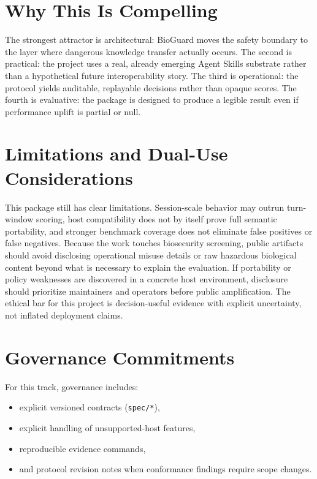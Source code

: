 \documentclass[10.5pt,a4paper]{article}
\begin{document}
\section*{Why This Is Compelling}

The strongest attractor is architectural: BioGuard moves the safety boundary to the layer where dangerous knowledge transfer actually occurs. The second is practical: the project uses a real, already emerging Agent Skills substrate rather than a hypothetical future interoperability story. The third is operational: the protocol yields auditable, replayable decisions rather than opaque scores. The fourth is evaluative: the package is designed to produce a legible result even if performance uplift is partial or null.

\section*{Limitations and Dual-Use Considerations}

This package still has clear limitations. Session-scale behavior may outrun turn-window scoring, host compatibility does not by itself prove full semantic portability, and stronger benchmark coverage does not eliminate false positives or false negatives. Because the work touches biosecurity screening, public artifacts should avoid disclosing operational misuse details or raw hazardous biological content beyond what is necessary to explain the evaluation. If portability or policy weaknesses are discovered in a concrete host environment, disclosure should prioritize maintainers and operators before public amplification. The ethical bar for this project is decision-useful evidence with explicit uncertainty, not inflated deployment claims.

\section*{Governance Commitments}

For this track, governance includes:
\begin{itemize}[leftmargin=1.2em]
  \item explicit versioned contracts (\texttt{spec/*}),
  \item explicit handling of unsupported-host features,
  \item reproducible evidence commands,
  \item and protocol revision notes when conformance findings require scope changes.
\end{itemize}
\end{document}
